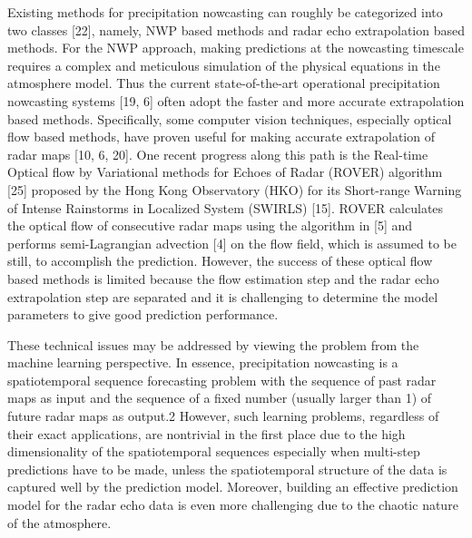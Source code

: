 \par Existing methods for precipitation nowcasting can roughly be categorized into two classes [22], namely, NWP based methods and radar echo extrapolation based methods. For the NWP approach, making predictions at the nowcasting timescale requires a complex and meticulous simulation of the physical equations in the atmosphere model. Thus the current state-of-the-art operational precipitation nowcasting systems [19, 6] often adopt the faster and more accurate extrapolation based methods. Specifically, some computer vision techniques, especially optical flow based methods, have proven useful for making accurate extrapolation of radar maps [10, 6, 20]. One recent progress along this path is the Real-time Optical flow by Variational methods for Echoes of Radar (ROVER) algorithm [25] proposed by the Hong Kong Observatory (HKO) for its Short-range Warning of Intense Rainstorms in Localized System (SWIRLS) [15]. ROVER calculates the optical flow of consecutive radar maps using the algorithm in [5] and performs semi-Lagrangian advection [4] on the flow field, which is assumed to be still, to accomplish the prediction. However, the success of these optical flow based methods is limited because the flow estimation step and the radar echo extrapolation step are separated and it is challenging to determine the model parameters to give good prediction performance.

\par These technical issues may be addressed by viewing the problem from the machine learning perspective. In essence, precipitation nowcasting is a spatiotemporal sequence forecasting problem with the sequence of past radar maps as input and the sequence of a fixed number (usually larger than 1) of future radar maps as output.2 However, such learning problems, regardless of their exact applications, are nontrivial in the first place due to the high dimensionality of the spatiotemporal sequences especially when multi-step predictions have to be made, unless the spatiotemporal structure of the data is captured well by the prediction model. Moreover, building an effective prediction model for the radar echo data is even more challenging due to the chaotic nature of the atmosphere.

